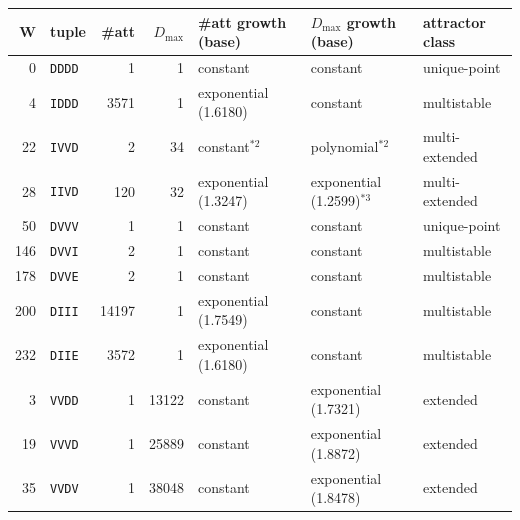 \begin{tabular}{@{}rl rr l l l@{}}
\toprule
W & tuple & \#att & $D_{\max}$ & \#att growth (base) & $D_{\max}$ growth (base) & attractor class \\
\midrule
0 & \texttt{DDDD} & 1 & 1 & constant & constant & unique-point \\
4 & \texttt{IDDD} & 3571 & 1 & exponential (1.6180) & constant & multistable \\
22 & \texttt{IVVD} & 2 & 34 & constant$^{\ast2}$ & polynomial$^{\ast2}$ & multi-extended \\
28 & \texttt{IIVD} & 120 & 32 & exponential (1.3247) & exponential (1.2599)$^{\ast3}$ & multi-extended \\
50 & \texttt{DVVV} & 1 & 1 & constant & constant & unique-point \\
146 & \texttt{DVVI} & 2 & 1 & constant & constant & multistable \\
178 & \texttt{DVVE} & 2 & 1 & constant & constant & multistable \\
200 & \texttt{DIII} & 14197 & 1 & exponential (1.7549) & constant & multistable \\
232 & \texttt{DIIE} & 3572 & 1 & exponential (1.6180) & constant & multistable \\
3 & \texttt{VVDD} & 1 & 13122 & constant & exponential (1.7321) & extended \\
19 & \texttt{VVVD} & 1 & 25889 & constant & exponential (1.8872) & extended \\
35 & \texttt{VVDV} & 1 & 38048 & constant & exponential (1.8478) & extended \\
\bottomrule
\end{tabular}

